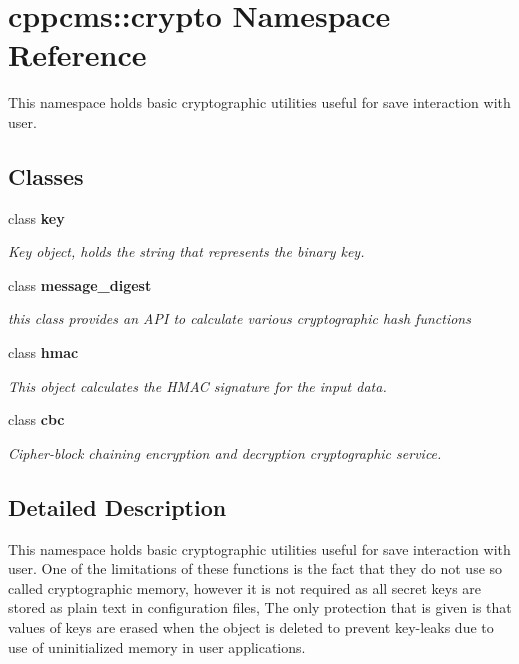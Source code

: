 \section{cppcms\-:\-:crypto \-Namespace \-Reference}
\label{namespacecppcms_1_1crypto}


\-This namespace holds basic cryptographic utilities useful for save interaction with user.  


\subsection*{\-Classes}
\begin{DoxyCompactItemize}
\item 
class {\bf key}
\begin{DoxyCompactList}\small\item\em \-Key object, holds the string that represents the binary key. \end{DoxyCompactList}\item 
class {\bf message\-\_\-digest}
\begin{DoxyCompactList}\small\item\em this class provides an \-A\-P\-I to calculate various cryptographic hash functions \end{DoxyCompactList}\item 
class {\bf hmac}
\begin{DoxyCompactList}\small\item\em \-This object calculates the \-H\-M\-A\-C signature for the input data. \end{DoxyCompactList}\item 
class {\bf cbc}
\begin{DoxyCompactList}\small\item\em \-Cipher-\/block chaining encryption and decryption cryptographic service. \end{DoxyCompactList}\end{DoxyCompactItemize}


\subsection{\-Detailed \-Description}
\-This namespace holds basic cryptographic utilities useful for save interaction with user. \-One of the limitations of these functions is the fact that they do not use so called cryptographic memory, however it is not required as all secret keys are stored as plain text in configuration files, \-The only protection that is given is that values of keys are erased when the object is deleted to prevent key-\/leaks due to use of uninitialized memory in user applications. 